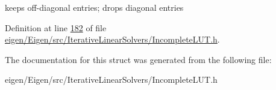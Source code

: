keeps off-\/diagonal entries; drops diagonal entries 

Definition at line \hyperlink{eigen_2_eigen_2src_2_iterative_linear_solvers_2_incomplete_l_u_t_8h_source_l00182}{182} of file \hyperlink{eigen_2_eigen_2src_2_iterative_linear_solvers_2_incomplete_l_u_t_8h_source}{eigen/\+Eigen/src/\+Iterative\+Linear\+Solvers/\+Incomplete\+L\+U\+T.\+h}.



The documentation for this struct was generated from the following file\+:\begin{DoxyCompactItemize}
\item 
eigen/\+Eigen/src/\+Iterative\+Linear\+Solvers/\+Incomplete\+L\+U\+T.\+h\end{DoxyCompactItemize}
